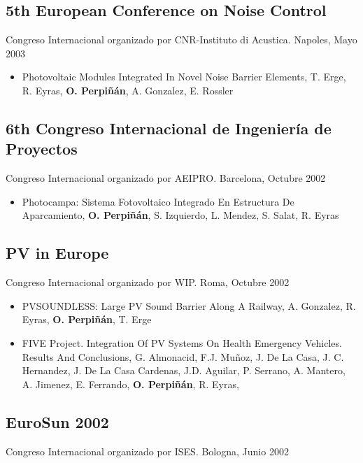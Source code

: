 \documentclass[article, a4paper]{memoir}
\begin{document}
\subsection{5th European Conference on Noise Control}
\label{sec-9-15}
Congreso Internacional organizado por CNR-Instituto di Acustica. Napoles, Mayo 2003

\begin{itemize}
\item Photovoltaic Modules Integrated In Novel Noise Barrier Elements, T. Erge, R. Eyras, \textbf{O. Perpiñán}, A. Gonzalez, E. Rossler
\end{itemize}

\subsection{6th Congreso Internacional de Ingeniería de Proyectos}
\label{sec-9-16}
Congreso Internacional organizado por AEIPRO. Barcelona, Octubre 2002

\begin{itemize}
\item Photocampa: Sistema Fotovoltaico Integrado En Estructura De Aparcamiento, \textbf{O. Perpiñán}, S. Izquierdo, L. Mendez, S. Salat, R. Eyras
\end{itemize}

\subsection{PV in Europe}
\label{sec-9-17}
Congreso Internacional organizado por WIP. Roma, Octubre 2002

\begin{itemize}
\item PVSOUNDLESS: Large PV Sound Barrier Along A Railway, A. Gonzalez, R. Eyras, \textbf{O. Perpiñán}, T. Erge

\item FIVE Project. Integration Of PV Systems On Health Emergency Vehicles. Results And Conclusions, G. Almonacid, F.J. Muñoz, J. De La Casa, J. C. Hernandez, J. De La Casa Cardenas, J.D. Aguilar, P. Serrano, A. Mantero, A. Jimenez, E.  Ferrando, \textbf{O. Perpiñán}, R. Eyras,
\end{itemize}

\subsection{EuroSun 2002}
\label{sec-9-18}
Congreso Internacional organizado por ISES. Bologna, Junio 2002
\end{document}
